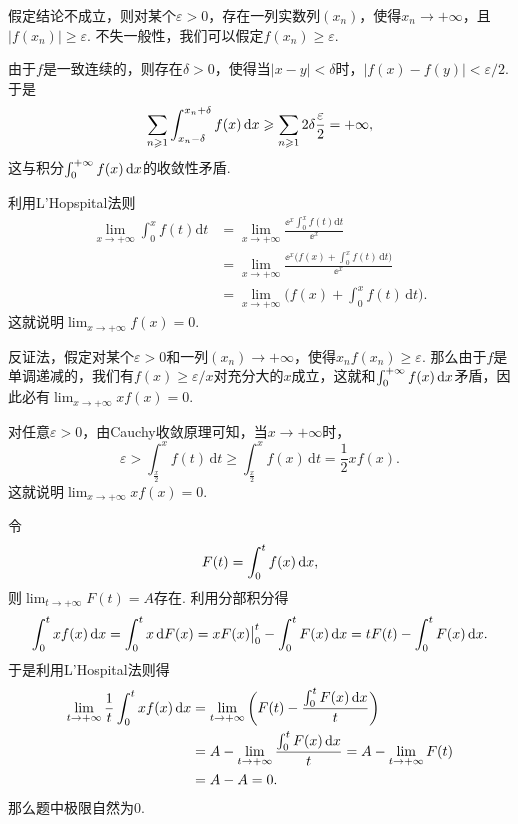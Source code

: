 \begin{ans}
  假定结论不成立，则对某个$\varepsilon>0$，存在一列实数列$(x_n)$，使得$x_n\to+\infty$，且$|f(x_n)|\ge\varepsilon$. 不失一般性，我们可以假定$f(x_n)\ge\varepsilon$.

  由于$f$是一致连续的，则存在$\delta>0$，使得当$|x-y|<\delta$时，$|f(x)-f(y)|<\varepsilon/2$. 于是
  \[
    \sum_{n\geqslant1}\int_{x_n-\delta}^{x_n+\delta}
    f(x)\,\mathrm dx\geqslant\sum_{n\geqslant1}2\delta\frac\varepsilon2=+\infty,
  \]
  这与积分$\int_0^{+\infty}f(x)\,\mathrm dx$的收敛性矛盾.
\end{ans}

\begin{ans}
  利用L'Hopspital法则
  \begin{align*}
    \lim_{x\to+\infty}\int_0^xf(t)\mathrm dt
    & = \lim_{x\to+\infty}\frac{\ee^x\int_0^xf(t)\mathrm dt}
    {\ee^x}\\
    & = \lim_{x\to+\infty}
    \frac{\ee^x\big(
    f(x)+\int_0^xf(t)\,\mathrm dt
    \big)}{\ee^x} \\
    & = \lim_{x\to+\infty}\bigg( f(x)+\int_0^xf(t)\,\mathrm dt \bigg).
  \end{align*}
  这就说明$\lim_{x\to+\infty}f(x)=0$.
\end{ans}

\begin{ans}
  \method 反证法，假定对某个$\varepsilon>0$和一列$(x_n)\to+\infty$，使得$x_nf(x_n)\ge\varepsilon$. 那么由于$f$是单调递减的，我们有$f(x)\ge\varepsilon/x$对充分大的$x$成立，这就和$\int_0^{+\infty}f(x)\,\mathrm dx$矛盾，因此必有$\lim_{x\to+\infty}xf(x)=0$.

  \method 对任意$\varepsilon>0$，由Cauchy收敛原理可知，当$x\to+\infty$时，
  \[ \varepsilon>\int_{\frac x2}^{x}f(t)\,\mathrm d t\ge
  \int_{\frac x2}^{x}f(x)\,\mathrm dt=\frac 12xf(x).  \]
  这就说明$\lim_{x\to+\infty}xf(x)=0$.
\end{ans}

\begin{ans}
  令
  \[ F(t)= \int_0^tf(x)\,\mathrm dx, \]
  则$\lim_{t\to+\infty}F(t)=A$存在. 利用分部积分得
  \[
    \int_0^txf(x)\,\mathrm dx=\int_0^tx\,\mathrm dF(x)
    = xF(x)\big|_0^t-\int_0^tF(x)\,\mathrm dx
    = tF(t)-\int_0^tF(x)\,\mathrm dx.
  \]
  于是利用L'Hospital法则得
  \begin{align*}
    \lim_{t\to+\infty}\frac1t\int_0^txf(x)\,\dx
    & = \lim_{t\to+\infty}\bigg(
     F(t) - \frac{\int_0^tF(x)\,\dx}t
    \bigg)\\
    & = A - \lim_{t\to+\infty}\frac{\int_0^tF(x)\,\dx}t
    = A - \lim_{t\to+\infty}F(t)\\
    & = A - A = 0.
  \end{align*}
  那么题中极限自然为0.
\end{ans}

